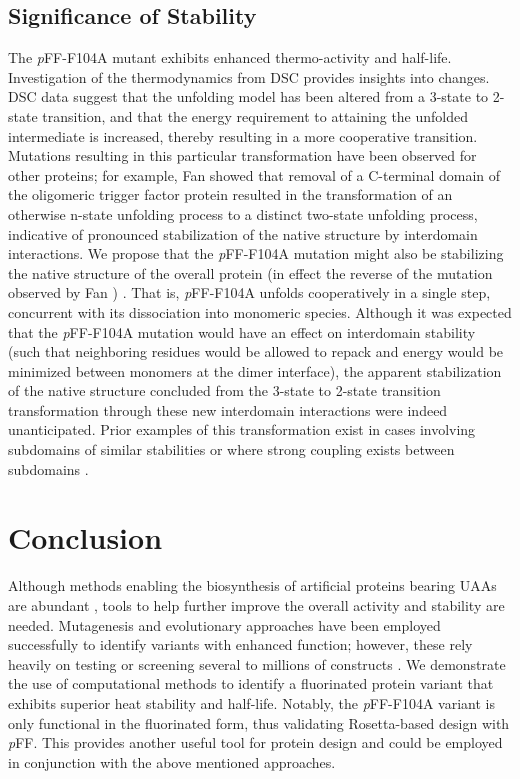 \begin{refsection}
\subsection{Significance of Stability}

The \emph{p}FF-F104A mutant exhibits enhanced thermo-activity and half-life.
Investigation of the thermodynamics from DSC provides insights into changes.
DSC data suggest that the unfolding model has been altered from a 3-state to
2-state transition, and that the energy requirement to attaining the unfolded
intermediate is increased, thereby resulting in a more cooperative transition.
Mutations resulting in this particular transformation have been observed for
other proteins; for example, Fan  showed that removal of a
C-terminal domain of the oligomeric  trigger factor protein
resulted in the transformation of an otherwise n-state unfolding process to a
distinct two-state unfolding process, indicative of pronounced stabilization of
the native structure by interdomain interactions. We propose that the
\emph{p}FF-F104A mutation might also be stabilizing the native structure of the
overall protein (in effect the reverse of the mutation observed by Fan
) \cite{Fan2008}. That is, \emph{p}FF-F104A unfolds cooperatively
in a single step, concurrent with its dissociation into monomeric
species. Although it was expected that the \emph{p}FF-F104A mutation would have
an effect on interdomain stability (such that neighboring residues would be
allowed to repack and energy would be minimized between monomers at the dimer
interface), the apparent stabilization of the native structure concluded from
the 3-state to 2-state transition transformation through these new interdomain
interactions were indeed unanticipated. Prior examples of this transformation
exist in cases involving subdomains of similar stabilities or where strong
coupling exists between subdomains \cite{Tsytlonok2013}.

\section{Conclusion}

Although methods enabling the biosynthesis of artificial proteins bearing UAAs
are abundant \cite{Voloshchuk2009}, tools to help further improve the overall
activity and stability are needed. Mutagenesis and evolutionary approaches have
been employed successfully to identify variants with enhanced function;
however, these rely heavily on testing or screening several to millions of
constructs \cite{Voloshchuk2007b,Montclare2006b,Yoo2007}. We demonstrate the use
of computational methods to identify a fluorinated protein variant that
exhibits superior heat stability and half-life. Notably, the \emph{p}FF-F104A
variant is only functional in the fluorinated form, thus validating
Rosetta-based design with \emph{p}FF. This provides another useful tool for
protein design and could be employed in conjunction with the above mentioned
approaches.

\printbibliography[heading=subbibliography]
\end{refsection}
